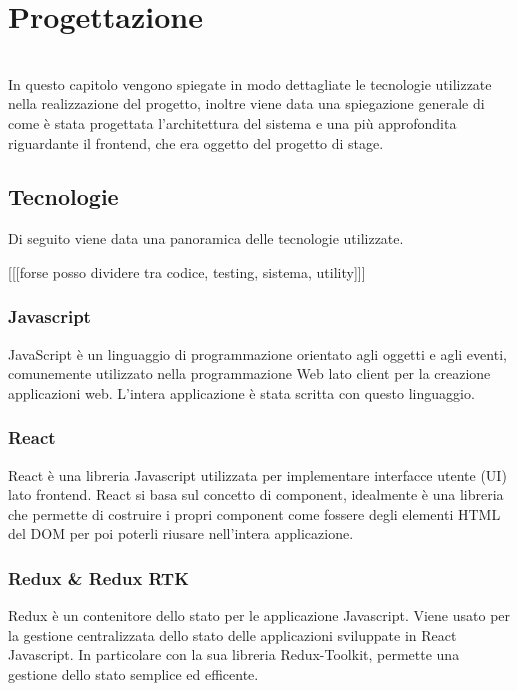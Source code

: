 
\chapter{Progettazione}
\label{cap:progettazione}

\\

In questo capitolo vengono spiegate in modo dettagliate le tecnologie utilizzate nella realizzazione del progetto, inoltre viene data una spiegazione generale di come è
stata progettata l'architettura del sistema e una più approfondita riguardante il frontend, che era oggetto del progetto di stage.

\section{Tecnologie}
\label{sec:tecnologie-strumenti}

Di seguito viene data una panoramica delle tecnologie utilizzate.

  [[[forse posso dividere tra codice, testing, sistema, utility]]]
\subsection*{Javascript}
JavaScript è un linguaggio di programmazione orientato agli oggetti e agli eventi, comunemente utilizzato nella programmazione Web lato client per la creazione applicazioni web. L'intera applicazione è stata scritta con questo linguaggio.

\subsection*{React}
React è una libreria Javascript utilizzata per implementare interfacce utente (UI) lato frontend. React si basa sul concetto di component, idealmente è una libreria che permette di costruire i propri component come fossere degli elementi HTML del DOM per poi poterli riusare nell'intera applicazione.

\subsection*{Redux \& Redux RTK}
Redux è un contenitore dello stato per le applicazione Javascript. Viene usato per la gestione centralizzata dello stato delle applicazioni sviluppate in React Javascript. In particolare con la sua libreria Redux-Toolkit, permette una gestione dello stato semplice ed efficente.

